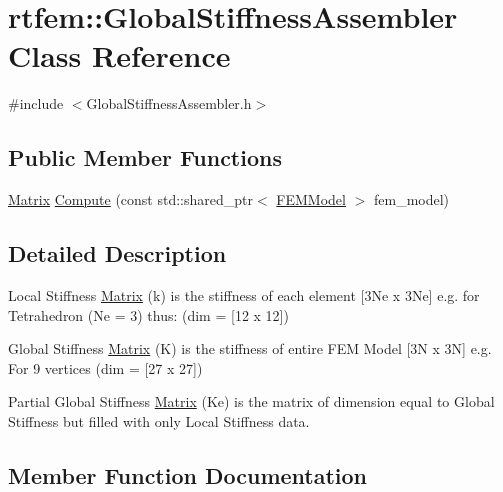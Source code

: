 \hypertarget{classrtfem_1_1GlobalStiffnessAssembler}{}\section{rtfem\+:\+:Global\+Stiffness\+Assembler Class Reference}
\label{classrtfem_1_1GlobalStiffnessAssembler}


{\ttfamily \#include $<$Global\+Stiffness\+Assembler.\+h$>$}

\subsection*{Public Member Functions}
\begin{DoxyCompactItemize}
\item 
\hyperlink{classrtfem_1_1Matrix}{Matrix} \hyperlink{classrtfem_1_1GlobalStiffnessAssembler_a1da0902be1ae9e0fe7a5f7d2645597e3}{Compute} (const std\+::shared\+\_\+ptr$<$ \hyperlink{classrtfem_1_1FEMModel}{F\+E\+M\+Model} $>$ fem\+\_\+model)
\end{DoxyCompactItemize}


\subsection{Detailed Description}
Local Stiffness \hyperlink{classrtfem_1_1Matrix}{Matrix} (k) is the stiffness of each element \mbox{[}3\+Ne x 3\+Ne\mbox{]} e.\+g. for Tetrahedron (Ne = 3) thus\+: (dim = \mbox{[}12 x 12\mbox{]})

Global Stiffness \hyperlink{classrtfem_1_1Matrix}{Matrix} (K) is the stiffness of entire F\+EM Model \mbox{[}3N x 3N\mbox{]} e.\+g. For 9 vertices (dim = \mbox{[}27 x 27\mbox{]})

Partial Global Stiffness \hyperlink{classrtfem_1_1Matrix}{Matrix} (Ke) is the matrix of dimension equal to Global Stiffness but filled with only Local Stiffness data. 

\subsection{Member Function Documentation}
\mbox{\label{classrtfem_1_1GlobalStiffnessAssembler_a1da0902be1ae9e0fe7a5f7d2645597e3}} 
